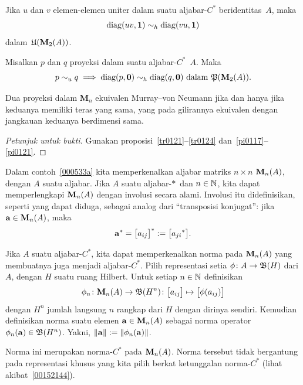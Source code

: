 \begin{exam}\label{0060129d} Jika $u$ dan $v$ elemen-elemen uniter dalam suatu aljabar-$C^*$ beridentitas~$A$, maka
   \[ \operatorname{diag}(uv,\mathbf{1}) \sim_h \operatorname{diag}(vu, \mathbf{1}) \]
dalam~$\mathfrak{U}(\mathbf{M}_{2}({A}))$.
\end{exam}

\begin{prop}\label{0060244} Misalkan $p$ dan $q$ proyeksi dalam suatu aljabar-$C^*$~$A$. Maka
   \[ p \sim_u q \implies \operatorname{diag}(p,\mathbf{0}) \sim_h \operatorname{diag}(q,\mathbf{0}) \text{ dalam $\mathfrak{P}(\mathbf{M}_{2}({A}))$.} \]
\end{prop}

\begin{exam}\label{0060247fa} Dua proyeksi dalam $\mathbf M_n$ ekuivalen Murray--von Neumann jika dan hanya jika keduanya memiliki teras yang sama,
yang pada gilirannya ekuivalen dengan jangkauan keduanya berdimensi sama.
\end{exam}

\begin{proof}[\emph{Petunjuk untuk bukti}] Gunakan proposisi~\ref{tr0121}--\ref{tr0124} dan~\ref{pi0117}--\ref{pi0121}.   \ns
\end{proof}

Dalam contoh~\ref{000533a} kita memperkenalkan aljabar matriks $n \times n$ $\mathbf{M}_{n}({A})$, dengan $A$ suatu aljabar. Jika $A$ suatu
aljabar-$*\,$ dan $n \in \mathbb{N}$, kita dapat memperlengkapi $\mathbf{M}_{n}({A})$ dengan involusi secara alami. Involusi itu didefinisikan, seperti yang dapat diduga,
sebagai analog dari ``transposisi konjugat'': jika $\mathbf{a} \in \mathbf{M}_{n}({A})$, maka
   \[ \mathbf{a}^* = \bigl[a_{ij}\bigr]^* := \bigl[{a_{ji}}^*\bigr]. \]

Jika $A$ suatu aljabar-$C^*$, kita dapat memperkenalkan norma pada $\mathbf{M}_{n}({A})$ yang membuatnya juga menjadi aljabar-$C^*$.
Pilih representasi setia $\phi\colon A \rightarrow \mathfrak{B}(H)$ dari $A$, dengan $H$ suatu ruang Hilbert. Untuk setiap $n \in \mathbb{N}$
definisikan
   \[ \phi_n\colon \mathbf{M}_{n}({A}) \rightarrow \mathfrak{B}(H^n)\colon \bigl[a_{ij}\bigr] \mapsto \bigl[ \phi(a_{ij})\bigr] \]
dengan $H^n$ jumlah langsung $n$ rangkap dari $H$ dengan dirinya sendiri. Kemudian definisikan norma suatu elemen $\mathbf{a} \in \mathbf{M}_{n}({A})$ sebagai
norma operator $\phi_n(\mathbf{a}) \in \mathfrak{B}(H^n)$. Yakni, $\lVert\mathbf{a}\rVert := \lVert\phi_n(\mathbf{a})\rVert$.

Norma ini merupakan norma-$C^*$ pada $\mathbf{M}_{n}({A})$. Norma tersebut tidak bergantung pada representasi khusus yang kita pilih berkat
ketunggalan norma-$C^*$ (lihat akibat~\ref{00152144}).

